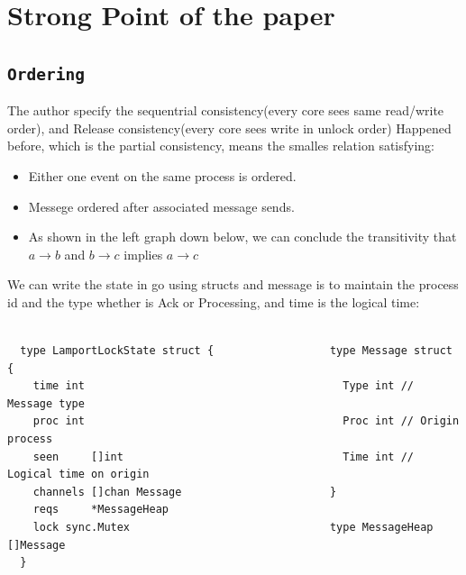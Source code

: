 \documentclass[acmlarge]{acmart}
\begin{document}



\maketitle

\section{Strong Point of the paper}


\subsection {\texttt{Ordering}}
The author specify the sequentrial consistency(every core sees same read/write order), and Release consistency(every core sees write in unlock order)
Happened before, which is the partial consistency, means the smalles relation satisfying:
\begin{itemize}
  \item Either one event on the same process is ordered.
  \item Messege ordered after associated message sends.
  \item As shown in the left graph down below, we can conclude the
        transitivity that $a \rightarrow b$ and $b \rightarrow c$ implies $a \rightarrow c$
\end{itemize}

We can write the state in go using structs and message is to maintain the process id and the type whether is Ack or Processing,
and time is the logical time:

\begin{lstlisting}

  type LamportLockState struct {                  type Message struct {
    time int                                      	Type int // Message type
    proc int                                      	Proc int // Origin process
    seen     []int                                	Time int // Logical time on origin
    channels []chan Message                       }
    reqs     *MessageHeap                         
    lock sync.Mutex                               type MessageHeap []Message
  }                 
  \end{lstlisting}
\end{document}
